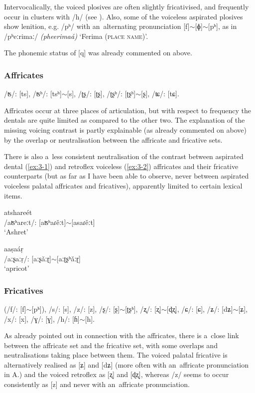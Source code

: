 Intervocalically, the voiced plosives are often slightly fricativised, and frequently occur in clusters with /h/ (see ). Also, some of the voiceless aspirated plosives show lenition, e.g. /pʰ/ with an~alternating pronunciation [f]$\sim$[ɸ]$\sim$[pʰ], as in /pʰeːrimaː/ \textit{(pheerimaá)} `Ferima (\textsc{place name)}'. 


The phonemic status of [q] was already commented on above.


\subsubsection*{Affricates}

/ʦ/: [ts], /ʦʰ/: [tsʰ]$\sim$[s], /ʈʂ/: [ʈʂ], /ʈʂʰ/: [ʈʂʰ]$\sim$[ʂ], /ʨ/: [tɕ].


Affricates occur at three places of articulation, but with respect to frequency the dentals are quite limited as compared to the other two. The explanation of the missing voicing contrast is partly explainable (as already commented on above) by the overlap or neutralisation between the affricate and fricative sets. 


There is also a~less consistent neutralisation of the contrast between aspirated dental (\ref{ex:3-1}) and retroflex voiceless (\ref{ex:3-2}) affricates and their fricative counterparts (but as far as I have been able to observe, never between aspirated voiceless palatal affricates and fricatives), apparently limited to certain lexical items. 

\begin{exe}
\ex
\label{ex:3-1}
\gll atshareét \\
 /aʦʰareːt/: [aʦʰaɾěːt]$\sim$[asaɾěːt] \\
\glt `Ashret'

\ex
\label{ex:3-2}
\gll aaṣaáṛ \\
/aːʂaːṛ/: [aːʂǎːɽ]$\sim$[aːʈʂʰǎːɽ] \\
\glt `apricot'
\end{exe}

\subsubsection*{Fricatives}

(/f/: [f]$\sim$[pʰ]), /s/: [s], /z/: [z], /ʂ/: [ʂ]$\sim$[ʈʂʰ], /ʐ/: [ʐ]$\sim$[ɖʐ], /ɕ/: [ɕ], /ʑ/: [dʑ]$\sim$[ʑ], /x/: [x], /ɣ/: [ɣ], /h/: [ɦ]$\sim$[h].


As already pointed out in connection with the affricates, there is a~close link between the affricate set and the fricative set, with some overlaps and neutralisations taking place between them. The voiced palatal fricative is alternatively realised as [ʑ] and [dʑ] (more often with an~affricate pronunciation in A.) and the voiced retroflex as [ʐ] and [ɖʐ], whereas /z/ seems to occur consistently as [z] and never with an~affricate pronunciation.


